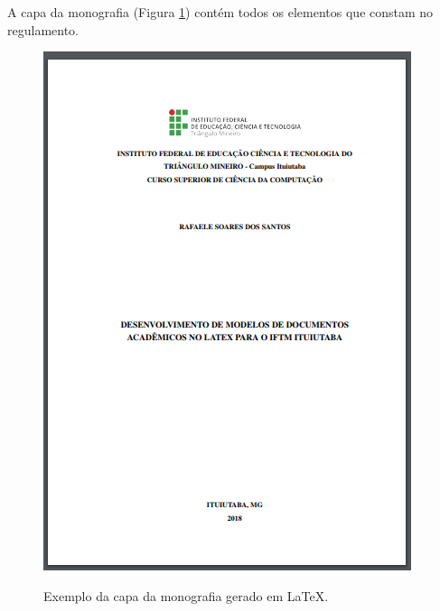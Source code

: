 A capa da monografia (Figura \ref{capamon}) contém todos os elementos que constam no regulamento.\\
\begin{figure}[h]
	\centering
	\includegraphics{imagens/monografia/Capa.png}\\
	\caption{Exemplo da capa da monografia gerado em LaTeX.}
	\label{capamon}
\end{figure}

